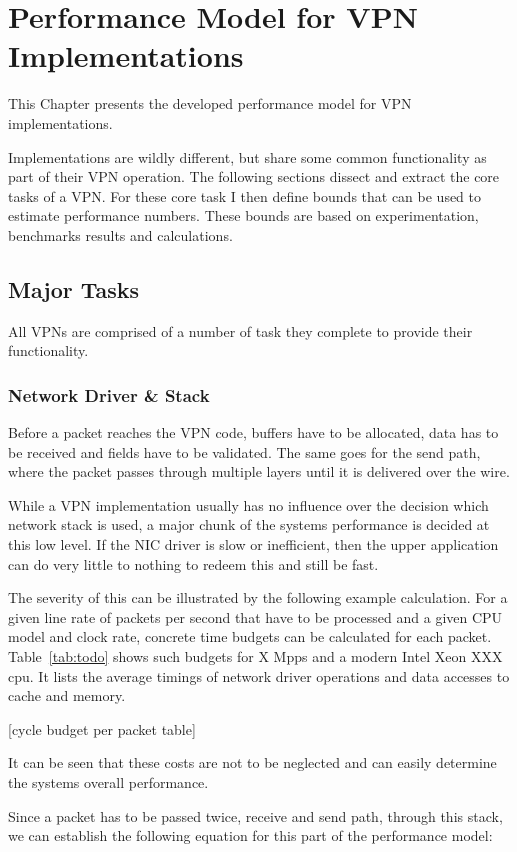 \chapter{Performance Model for VPN Implementations}
\label{chap:perf_model}
This Chapter presents the developed performance model for VPN implementations. 

Implementations are wildly different, but share some common functionality as part of their VPN operation. The following sections dissect and extract the core tasks of a VPN. For these core task I then define bounds that can be used to estimate performance numbers. These bounds are based on experimentation, benchmarks results and calculations.

\section{Major Tasks}
All VPNs are comprised of a number of task they complete to provide their functionality.

\subsection{Network Driver \& Stack}
Before a packet reaches the VPN code, buffers have to be allocated, data has to be received and fields have to be validated. The same goes for the send path, where the packet passes through multiple layers until it is delivered over the wire.

While a VPN implementation usually has no influence over the decision which network stack is used, a major chunk of the systems performance is decided at this low level.
If the NIC driver is slow or inefficient, then the upper application can do very little to nothing to redeem this and still be fast.

The severity of this can be illustrated by the following example calculation. For a given line rate of packets per second that have to be processed and a given CPU model and clock rate, concrete time budgets can be calculated for each packet. Table~\ref{tab:todo} shows such budgets for X Mpps and a modern Intel Xeon XXX cpu. It lists the average timings of network driver operations and data accesses to cache and memory. 

[cycle budget per packet table]

It can be seen that these costs are not to be neglected and can easily determine the systems overall performance.

Since a packet has to be passed twice, receive and send path, through this stack, we can establish the following equation for this part of the performance model: 

